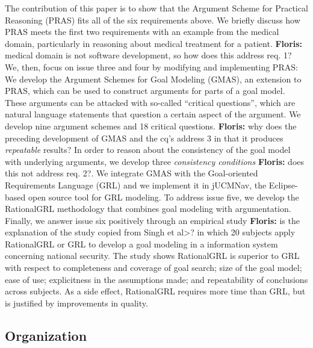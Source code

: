 \documentclass[11.5pt,two column]{llncs}
\newcommand{\floris}[1]{{\color{red}\textbf{Floris: }#1}}
\begin{document}
The contribution of this paper is to show that the Argument Scheme for Practical Reasoning (PRAS) fits all of the six requirements above. We briefly discuss how PRAS meets the first two requirements with an example from the medical domain, particularly in reasoning about medical treatment for a patient. \floris{medical domain is not software development, so how does this address req. 1?} We, then, focus on issue three and four by modifying and implementing PRAS: We develop the Argument Schemes for Goal Modeling (GMAS), an extension to PRAS, which can be used to construct arguments for parts of a goal model. These arguments can be attacked with so-called ``critical questions'', which are natural language statements that question a certain aspect of the argument. We develop nine argument schemes and 18 critical questions. \floris{why does the preceding development of GMAS and the cq's address 3 in that it produces \emph{repeatable} results?} In order to reason about the consistency of the goal model with underlying arguments, we develop three \emph{consistency conditions} \floris{does this not address req. 2?}. We integrate GMAS with the Goal-oriented Requirements Language (GRL) and we implement it in jUCMNav, the Eclipse-based open source tool for GRL modeling. To address issue five, we develop the RationalGRL methodology that combines goal modeling with argumentation. Finally, we answer issue six positively through an empirical study \floris{is the explanation of the study copied from Singh et al>?} in which 20 subjects apply RationalGRL or GRL to develop a goal modeling in a information system concerning national security. The study shows RationalGRL is superior to GRL with respect to completeness and coverage of goal search; size of the goal model; ease of use; explicitness in the assumptions made; and repeatability of conclusions across subjects. As a side effect, RationalGRL requires more time than GRL, but is justified by improvements in quality.

\subsection{Organization}
\end{document}
